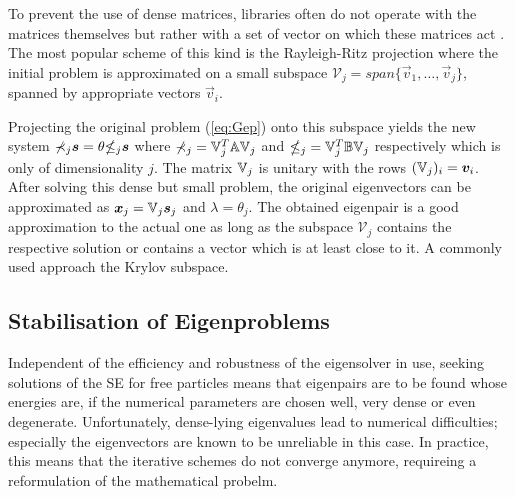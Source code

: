 To prevent the use of dense matrices, libraries often do not operate with the matrices themselves but rather with a set of vector on which these matrices act \cite{slepcManual}.
The most popular scheme of this kind is the Rayleigh-Ritz projection where the initial problem is approximated on a small subspace $\mathcal{V}_j=span \{\vec{v}_1,\hdots,\vec{v}_j\}$, spanned by appropriate vectors $\vec{v}_i$.

Projecting the original problem (\ref{eq:Gep}) onto this subspace yields the new system $\mathbb{\Sigma}_j \bm{s}=\theta\mathbb{\Theta}_j\bm{s}$ where $\mathbb{\Sigma}_j=\mathbb{V}_j^T\mathbb{A}\mathbb{V}_j$ and $\mathbb{\Theta}_j=\mathbb{V}_j^T\mathbb{B}\mathbb{V}_j$ respectively which is only of dimensionality $j$.
The matrix $\mathbb{V}_j$ is unitary with the rows $(\mathbb{V}_j)_i=\bm{v}_i$.
After solving this dense but small problem, the original eigenvectors can be approximated as $\bm{x}_j=\mathbb{V}_j\bm{s}_j$ and $\lambda=\theta_j$.
The obtained eigenpair is a good approximation to the actual one as long as the subspace $\mathcal{V}_j$ contains the respective solution or contains a vector which is at least close to it.
A commonly used approach the Krylov subspace.

\subsection{Stabilisation of Eigenproblems}
\label{ch:regular}
Independent of the efficiency and robustness of the eigensolver in use, seeking solutions of the SE for free particles means that eigenpairs are to be found whose energies are, if the numerical parameters are chosen well, very dense or even degenerate.
Unfortunately, dense-lying eigenvalues lead to numerical difficulties; especially the eigenvectors are known to be unreliable in this case.
In practice, this means that the iterative schemes do not converge anymore, requireing a reformulation of the mathematical probelm.

